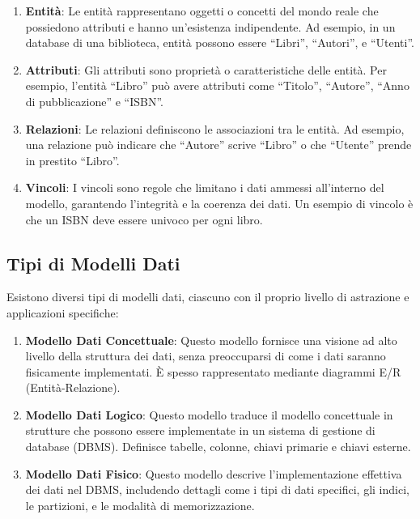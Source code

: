 \documentclass[
  letterpaper,
]{scrbook}
\begin{document}
\begin{enumerate}
\def\labelenumi{\arabic{enumi}.}
\item
  \textbf{Entità}: Le entità rappresentano oggetti o concetti del mondo
  reale che possiedono attributi e hanno un'esistenza indipendente. Ad
  esempio, in un database di una biblioteca, entità possono essere
  ``Libri'', ``Autori'', e ``Utenti''.
\item
  \textbf{Attributi}: Gli attributi sono proprietà o caratteristiche
  delle entità. Per esempio, l'entità ``Libro'' può avere attributi come
  ``Titolo'', ``Autore'', ``Anno di pubblicazione'' e ``ISBN''.
\item
  \textbf{Relazioni}: Le relazioni definiscono le associazioni tra le
  entità. Ad esempio, una relazione può indicare che ``Autore'' scrive
  ``Libro'' o che ``Utente'' prende in prestito ``Libro''.
\item
  \textbf{Vincoli}: I vincoli sono regole che limitano i dati ammessi
  all'interno del modello, garantendo l'integrità e la coerenza dei
  dati. Un esempio di vincolo è che un ISBN deve essere univoco per ogni
  libro.
\end{enumerate}

\subsection{Tipi di Modelli Dati}\label{tipi-di-modelli-dati}

Esistono diversi tipi di modelli dati, ciascuno con il proprio livello
di astrazione e applicazioni specifiche:

\begin{enumerate}
\def\labelenumi{\arabic{enumi}.}
\item
  \textbf{Modello Dati Concettuale}: Questo modello fornisce una visione
  ad alto livello della struttura dei dati, senza preoccuparsi di come i
  dati saranno fisicamente implementati. È spesso rappresentato mediante
  diagrammi E/R (Entità-Relazione).
\item
  \textbf{Modello Dati Logico}: Questo modello traduce il modello
  concettuale in strutture che possono essere implementate in un sistema
  di gestione di database (DBMS). Definisce tabelle, colonne, chiavi
  primarie e chiavi esterne.
\item
  \textbf{Modello Dati Fisico}: Questo modello descrive
  l'implementazione effettiva dei dati nel DBMS, includendo dettagli
  come i tipi di dati specifici, gli indici, le partizioni, e le
  modalità di memorizzazione.
\end{enumerate}
\end{document}
